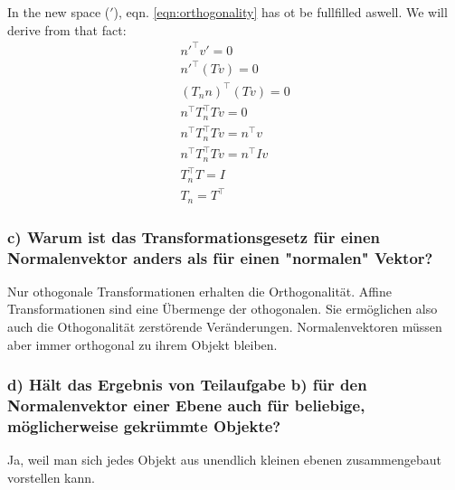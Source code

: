 \documentclass[a4paper,headings=small]{scrartcl}
\numberwithin{equation}{section} %
\numberwithin{figure}{section}   %
\begin{document}
In the new space ($'$),
eqn. \ref{eqn:orthogonality} has ot be fullfilled aswell.
We will derive from that fact:
\begin{align}
n'^{\top} v' = 0 \\
n'^{\top} (T v) = 0 \\
(T_n n)^{\top} (T v) = 0 \\
n^{\top} T_n^{\top} T v = 0 \\
n^{\top} T_n^{\top} T v = n^{\top} v \\
n^{\top} T_n^{\top} T v = n^{\top} I v \\
T_n^{\top} T = I \\
T_n = T^{\top}
\end{align}

\subsubsection{c) Warum ist das Transformationsgesetz für einen Normalenvektor anders als für einen "normalen" Vektor?}
Nur othogonale Transformationen erhalten die Orthogonalität. Affine Transformationen sind eine Übermenge der othogonalen. Sie ermöglichen also auch die Othogonalität zerstörende Veränderungen. Normalenvektoren müssen aber immer orthogonal zu ihrem Objekt bleiben.

\subsubsection{d) Hält das Ergebnis von Teilaufgabe b) für den Normalenvektor einer Ebene auch für beliebige, möglicherweise gekrümmte Objekte?}
Ja, weil man sich jedes Objekt aus unendlich kleinen ebenen zusammengebaut vorstellen kann.
\end{document}
